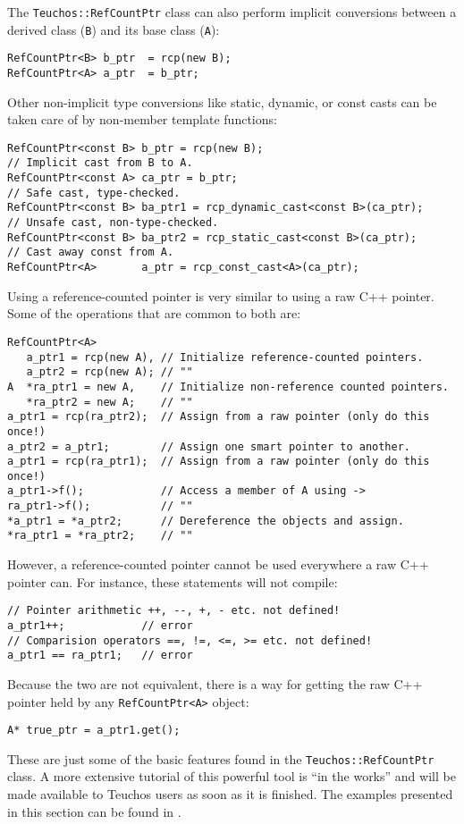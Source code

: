 The {\tt Teuchos::RefCountPtr} class can also perform implicit conversions between a derived
class ({\tt B}) and its base class ({\tt A}):

{\small
\begin{verbatim}
RefCountPtr<B> b_ptr  = rcp(new B);
RefCountPtr<A> a_ptr  = b_ptr;
\end{verbatim}}

\noindent Other non-implicit type conversions like static, dynamic, or const casts
can be taken care of by non-member template functions:

{\small
\begin{verbatim}
RefCountPtr<const B> b_ptr = rcp(new B);
// Implicit cast from B to A.
RefCountPtr<const A> ca_ptr = b_ptr;                              
// Safe cast, type-checked.
RefCountPtr<const B> ba_ptr1 = rcp_dynamic_cast<const B>(ca_ptr); 
// Unsafe cast, non-type-checked.
RefCountPtr<const B> ba_ptr2 = rcp_static_cast<const B>(ca_ptr);  
// Cast away const from A.
RefCountPtr<A>       a_ptr = rcp_const_cast<A>(ca_ptr);           
\end{verbatim}}

Using a reference-counted pointer is very similar to using a raw C++ pointer.  Some
of the operations that are common to both are:
{\small
\begin{verbatim}
RefCountPtr<A>
   a_ptr1 = rcp(new A), // Initialize reference-counted pointers.
   a_ptr2 = rcp(new A); // ""
A  *ra_ptr1 = new A,    // Initialize non-reference counted pointers.
   *ra_ptr2 = new A;    // ""
a_ptr1 = rcp(ra_ptr2);  // Assign from a raw pointer (only do this once!)
a_ptr2 = a_ptr1;        // Assign one smart pointer to another.
a_ptr1 = rcp(ra_ptr1);  // Assign from a raw pointer (only do this once!)
a_ptr1->f();            // Access a member of A using ->
ra_ptr1->f();           // ""
*a_ptr1 = *a_ptr2;      // Dereference the objects and assign.
*ra_ptr1 = *ra_ptr2;    // ""
\end{verbatim}}

\noindent However, a reference-counted pointer cannot be used everywhere a raw C++ pointer
can.  For instance, these statements will not compile:
{\small
\begin{verbatim}
// Pointer arithmetic ++, --, +, - etc. not defined!
a_ptr1++;            // error  
// Comparision operators ==, !=, <=, >= etc. not defined!
a_ptr1 == ra_ptr1;   // error 
\end{verbatim}}

\noindent Because the two are not equivalent, there is a way for getting the 
raw C++ pointer held by any {\tt RefCountPtr<A>} object:
{\small
\begin{verbatim}
A* true_ptr = a_ptr1.get();
\end{verbatim}}
These are just some of the basic features found in the {\tt Teuchos::RefCountPtr} class.  
A more extensive tutorial of this powerful tool is ``in the works'' and will be made available
to Teuchos users as soon as it is finished.  The examples presented in this section can be found in
.  

